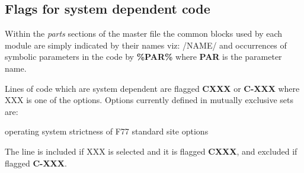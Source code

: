 \documentclass[onecolumn,twoside,11pt,a4paper]{report}
\begin{document}
\subsection {Flags for system dependent code}
Within the \emph{parts} sections of the master file the common blocks used by
each module are simply indicated by their names viz: /NAME/ and occurrences of
symbolic parameters in the code by \textbf{\%PAR\%} where \textbf{PAR} 
is the parameter name.
\par
Lines of code which are system dependent are flagged \textbf{CXXX} or 
\textbf{C-XXX} where XXX is
one of the options. Options currently defined in mutually exclusive sets are:
\begin{listdirectory}
   {operating system } 
  {strictness of F77 standard} 
    {site options} 
\end{listdirectory}
The line is included if XXX is selected and it is flagged \textbf{CXXX}, and excluded
if flagged \textbf{C-XXX}.
%   
\end{document}
